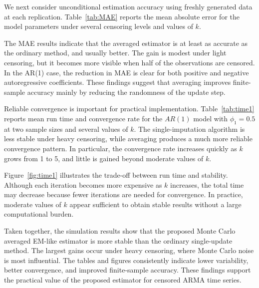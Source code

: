 \documentclass[10pt,twoside]{article}
\numberwithin{equation}{section}
\begin{document}
We next consider unconditional estimation accuracy using freshly generated data at each replication. Table~\ref{tab:MAE} reports the mean absolute error for the model parameters under several censoring levels and values of $k$.

	

The MAE results indicate that the averaged estimator is at least as accurate as the ordinary method, and usually better. The gain is modest under light censoring, but it becomes more visible when half of the observations are censored. In the AR(1) case, the reduction in MAE is clear for both positive and negative autoregressive coefficients. These findings suggest that averaging improves finite-sample accuracy mainly by reducing the randomness of the update step.

	

Reliable convergence is important for practical implementation. Table~\ref{tab:time1} reports mean run time and convergence rate for the $AR(1)$ model with $\phi_1=0.5$ at two sample sizes and several values of $k$. The single-imputation algorithm is less stable under heavy censoring, while averaging produces a much more reliable convergence pattern. In particular, the convergence rate increases quickly as $k$ grows from 1 to 5, and little is gained beyond moderate values of $k$.

	

Figure~\ref{fig:time1} illustrates the trade-off between run time and stability. Although each iteration becomes more expensive as $k$ increases, the total time may decrease because fewer iterations are needed for convergence. In practice, moderate values of $k$ appear sufficient to obtain stable results without a large computational burden.

	

Taken together, the simulation results show that the proposed Monte Carlo averaged EM-like estimator is more stable than the ordinary single-update method. The largest gains occur under heavy censoring, where Monte Carlo noise is most influential. The tables and figures consistently indicate lower variability, better convergence, and improved finite-sample accuracy. These findings support the practical value of the proposed estimator for censored ARMA time series.
\end{document}
